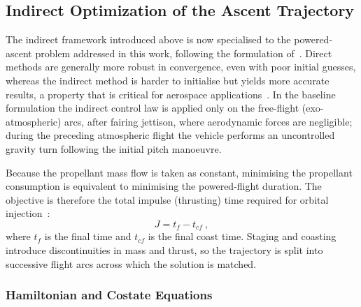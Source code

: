 
\subsection{Indirect Optimization of the Ascent Trajectory}
\label{ssec:indirect_ascent}

The indirect framework introduced above is now specialised to the powered-ascent problem addressed in this work, following the formulation of~\cite{Morgado2022_MultistagePrelimDesignTrajectoryOpt}. Direct methods are generally more robust in convergence, even with poor initial guesses, whereas the indirect method is harder to initialise but yields more accurate results, a property that is critical for aerospace applications~\cite{conway2010spacecraft}. In the baseline formulation the indirect control law is applied only on the free-flight (exo-atmospheric) arcs, after fairing jettison, where aerodynamic forces are negligible; during the preceding atmospheric flight the vehicle performs an uncontrolled gravity turn following the initial pitch manoeuvre.

Because the propellant mass flow is taken as constant, minimising the propellant consumption is equivalent to minimising the powered-flight duration. The objective is therefore the total impulse (thrusting) time required for orbital injection~\cite{Morgado2022_MultistagePrelimDesignTrajectoryOpt}:
\begin{equation}
J = t_f - t_{cf} \ ,
\label{eq:indirect_objective}
\end{equation}
where $t_f$ is the final time and $t_{cf}$ is the final coast time. Staging and coasting introduce discontinuities in mass and thrust, so the trajectory is split into successive flight arcs across which the solution is matched.

\subsubsection{Hamiltonian and Costate Equations}

